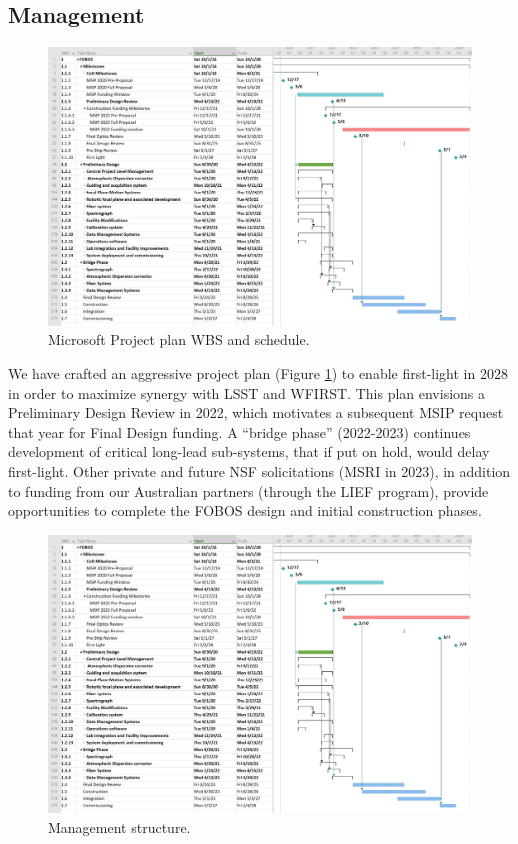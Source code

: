 \documentclass[oneside,11pt]{amsart}
\begin{document}
\subsection{Management}

\begin{figure}[h!]
%
\vskip -0.1in
%
\includegraphics[width=\textwidth]{figs/Pre-Proposal_Project_figure.jpg}
%
\caption{\small Microsoft Project plan WBS and schedule.}
%
\label{fig:gantt}
%
\end{figure}

We have crafted an aggressive project plan (Figure \ref{fig:gantt}) to enable first-light in 2028 in order to maximize
synergy with LSST and WFIRST.  This plan envisions a Preliminary Design Review in 2022, which motivates a subsequent
MSIP request that year for Final Design funding.  A ``bridge phase'' (2022-2023) continues development of critical
long-lead sub-systems, that if put on hold, would delay first-light.  Other private and future NSF solicitations (MSRI
in 2023), in addition to funding from our Australian partners (through the LIEF program), provide opportunities to
complete the FOBOS design and initial construction phases.


\begin{figure}[h!]
%
\vskip -0.1in
%
\includegraphics[width=\textwidth]{figs/Pre-Proposal_Project_figure.jpg}
%
\caption{\small Management structure.}
%
\label{fig:org}
%
\end{figure}
\end{document}
